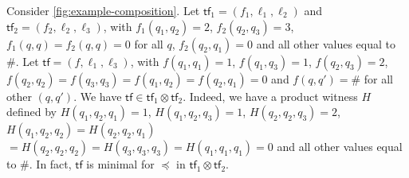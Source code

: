 \documentclass[10pt,a4paper]{article}
\newcommand*{\abuchistate}{\ell}
\newcommand*{\controlloc}{\abuchistate}
\newcommand*{\dummysymb}{\#}
\newcommand*{\atf}{\mathsf{tf}}
\newcommand*{\tftimes}{\otimes}
\newcommand*{\letf}{\preceq}
\begin{document}
\begin{example}
	Consider \cref{fig:example-composition}.
	Let \(\atf_1 = (f_1, \controlloc_1, \controlloc_2)\) and \(\atf_2 = (f_2, \controlloc_2, \controlloc_3)\), with \(f_1(q_1,q_2) = 2\), \(f_2(q_2,q_3) = 3\), \(f_1(q,q) = f_2(q,q) = 0\) for all \(q\), \(f_2(q_2,q_1) = 0\) and all other values equal to \(\dummysymb\).
	Let \(\atf = (f, \controlloc_1, \controlloc_3)\), with \(f(q_1,q_1) = 1\), \(f(q_1,q_3) = 1\), \(f(q_2,q_3) = 2\), \(f(q_2,q_2) = f(q_3,q_3) = f(q_1,q_2) = f(q_2,q_1) = 0\) and \(f(q,q') = \dummysymb\) for all other \((q,q')\).
	We have \(\atf \in \atf_1 \tftimes \atf_2\).
	Indeed, we have a product witness \(H\) defined by \(H(q_1, q_2,q_1) = 1\), \(H(q_1,q_2,q_3) = 1\), \(H(q_2,q_2,q_3) = 2\), \(H(q_1,q_2,q_2) = H(q_2,q_2,q_1)\) \(= H(q_2,q_2,q_2) = H(q_3,q_3,q_3) = H(q_1,q_1,q_1) = 0\) and all other values equal to \(\dummysymb\).
	In fact, \(\atf\) is minimal for \(\letf\) in \(\atf_1 \tftimes \atf_2\).
\end{example}
\end{document}
